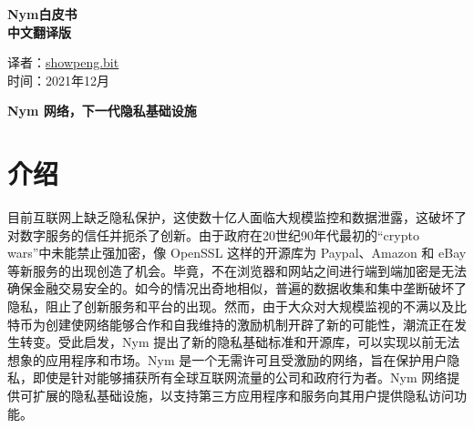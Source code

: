 \documentclass{article}
\begin{document}
	\thispagestyle{empty}
    	\begin{center}
    	\parbox[t][12cm][c]{\textwidth}{\Huge
    	\begin{center} {\textbf{Nym白皮书\\中文翻译版 }}\end{center} }

    	\parbox[t][8cm][t]{\textwidth}{\Large
    	\begin{center} 译者：\href{https://showpeng.bit.host/}{showpeng.bit}  \\ 时间：2021年12月\\ \end{center} }
    	\end{center}
   
    	\clearpage
	
	
	\begin{center}
	\parbox[t][2cm][c]{\textwidth}{\LARGE
    	\begin{center} {\textbf{Nym 网络，下一代隐私基础设施}}\end{center} } \newline
	\end{center}
	
	\justifying {}
	
	\section{介绍}
	
	目前互联网上缺乏隐私保护，这使数十亿人面临大规模监控和数据泄露，这破坏了对数字服务的信任并扼杀了创新。由于政府在20世纪90年代最初的“crypto wars”中未能禁止强加密\cite{ref72}，像 OpenSSL 这样的开源库为 Paypal、Amazon 和 eBay 等新服务的出现创造了机会。毕竟，不在浏览器和网站之间进行端到端加密是无法确保金融交易安全的。如今的情况出奇地相似，普遍的数据收集和集中垄断破坏了隐私，阻止了创新服务和平台的出现。然而，由于大众对大规模监视的不满以及比特币为创建使网络能够合作和自我维持的激励机制开辟了新的可能性，潮流正在发生转变。受此启发，Nym 提出了新的隐私基础标准和开源库，可以实现以前无法想象的应用程序和市场。Nym 是一个无需许可且受激励的网络，旨在保护用户隐私，即使是针对能够捕获所有全球互联网流量的公司和政府行为者。Nym 网络提供可扩展的隐私基础设施，以支持第三方应用程序和服务向其用户提供隐私访问功能。\newline
\end{document}
